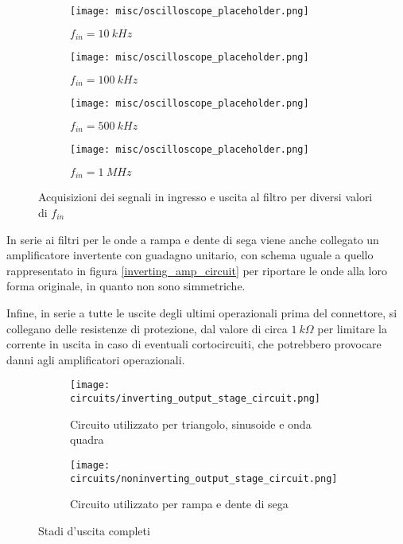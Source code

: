 \begin{figure}[H]
    \centering

    \begin{subfigure}{.5\textwidth}
        \centering
        \texttt{[image: misc/oscilloscope\_placeholder.png]}
        \caption{$f_{in}=10\ kHz$}
        \label{acq_filter_10kHz}
    \end{subfigure}%
    \begin{subfigure}{.5\textwidth}
        \centering
        \texttt{[image: misc/oscilloscope\_placeholder.png]}
        \caption{$f_{in}=100\ kHz$}
        \label{acq_filter_100kHz}
    \end{subfigure}
    \begin{subfigure}{.5\textwidth}
        \centering
        \texttt{[image: misc/oscilloscope\_placeholder.png]}
        \caption{$f_{in}=500\ kHz$}
        \label{acq_filter_500kHz}
    \end{subfigure}%
    \begin{subfigure}{.5\textwidth}
        \centering
        \texttt{[image: misc/oscilloscope\_placeholder.png]}
        \caption{$f_{in}=1\ MHz$}
        \label{acq_filter_MHz}
    \end{subfigure}

    \caption{Acquisizioni dei segnali in ingresso e uscita al filtro per diversi valori di $f_{in}$}
    \label{acq_filter}
\end{figure}

In serie ai filtri per le onde a rampa e dente di sega viene anche collegato un amplificatore
invertente con guadagno unitario, con schema uguale a quello rappresentato in figura \ref{inverting_amp_circuit}
per riportare le onde alla loro forma originale, in quanto non sono simmetriche.

Infine, in serie a tutte le uscite degli ultimi operazionali prima del connettore, si collegano
delle resistenze di protezione, dal valore di circa $1\ k\Omega$ per limitare la corrente in
uscita in caso di eventuali cortocircuiti, che potrebbero provocare danni agli amplificatori
operazionali.

\begin{figure}[H]
    \centering

    \begin{subfigure}{\textwidth}
        \centering
        \texttt{[image: circuits/inverting\_output\_stage\_circuit.png]}
        \caption{Circuito utilizzato per triangolo, sinusoide e onda quadra}
        \label{inverting_output_stage_circuit}
    \end{subfigure}
    \begin{subfigure}{\textwidth}
        \centering
        \texttt{[image: circuits/noninverting\_output\_stage\_circuit.png]}
        \caption{Circuito utilizzato per rampa e dente di sega}
        \label{noninverting_output_stage_circuit}
    \end{subfigure}

    \caption{Stadi d'uscita completi}
    \label{output_stages}
\end{figure}

